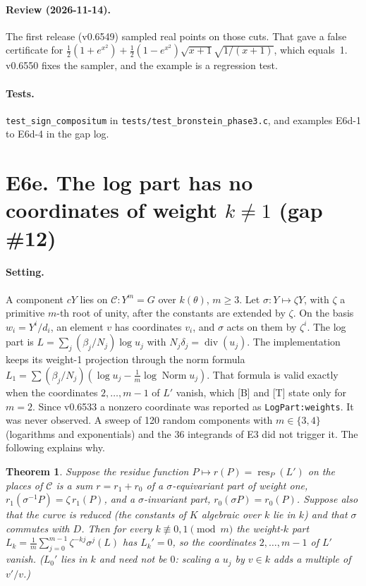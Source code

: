 \documentclass[11pt]{article}
\newtheorem{theorem}{Theorem}[section]
\theoremstyle{definition}
\theoremstyle{remark}
\newcommand{\code}[1]{\texttt{#1}}
\begin{document}
\paragraph{Review (2026-11-14).} The first release (v0.6549) sampled real points
on those cuts. That gave a false certificate for
$\tfrac12(1+e^{x^2})+\tfrac12(1-e^{x^2})\sqrt{x+1}\sqrt{1/(x+1)}$, which equals~1.
v0.6550 fixes the sampler, and the example is a regression test.

\paragraph{Tests.} \code{test\_sign\_compositum} in
\code{tests/test\_bronstein\_phase3.c}, and examples E6d-1 to E6d-4 in the gap log.

\section*{E6e. The log part has no coordinates of weight $k\ne1$ (gap \#12)}

\paragraph{Setting.} A component $cY$ lies on $\mathcal C: Y^m=G$ over
$k(\theta)$, $m\ge3$. Let $\sigma: Y\mapsto\zeta Y$, with $\zeta$ a primitive
$m$-th root of unity, after the constants are extended by $\zeta$. On the basis
$w_i=Y^i/d_i$, an element $v$ has coordinates $v_i$, and $\sigma$ acts on them
by $\zeta^i$. The log part is $L=\sum_j(\beta_j/N_j)\log u_j$ with
$N_j\delta_j=\operatorname{div}(u_j)$. The implementation keeps its weight-1
projection through the norm formula
$L_1=\sum(\beta_j/N_j)(\log u_j-\tfrac1m\log\operatorname{Norm}u_j)$. That
formula is valid exactly when the coordinates $2,\dots,m-1$ of $L'$ vanish,
which [B] and [T] state only for $m=2$. Since v0.6533 a nonzero coordinate was
reported as \code{LogPart:weights}. It was never observed. A sweep of 120
random components with $m\in\{3,4\}$ (logarithms and exponentials) and the 36
integrands of E3 did not trigger it. The following explains why.

\begin{theorem}\label{thm:E6e}
Suppose the residue function $P\mapsto r(P)=\operatorname{res}_P(L')$ on the
places of $\mathcal C$ is a sum $r=r_1+r_0$ of a $\sigma$-equivariant part of
weight one, $r_1(\sigma^{-1}P)=\zeta\,r_1(P)$, and a $\sigma$-invariant part,
$r_0(\sigma P)=r_0(P)$. Suppose also that the curve is reduced (the constants
of $K$ algebraic over $k$ lie in $k$) and that $\sigma$ commutes with $D$. Then
for every $k\not\equiv0,1\pmod m$ the weight-$k$ part
$L_k=\tfrac1m\sum_{j=0}^{m-1}\zeta^{-kj}\sigma^j(L)$ has $L_k'=0$, so the
coordinates $2,\dots,m-1$ of $L'$ vanish. ($L_0'$ lies in $k$ and need not be
$0$: scaling a $u_j$ by $v\in k$ adds a multiple of $v'/v$.)
\end{theorem}
\end{document}
